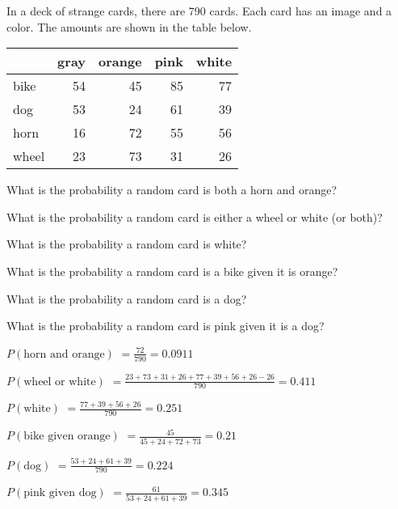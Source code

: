 
\begin{question}
In a deck of strange cards, there are 790 cards. Each card has an image
and a color. The amounts are shown in the table below.

\begin{longtable}[]{@{}lrrrr@{}}
\toprule
& gray & orange & pink & white\tabularnewline
\midrule
\endhead
bike & 54 & 45 & 85 & 77\tabularnewline
dog & 53 & 24 & 61 & 39\tabularnewline
horn & 16 & 72 & 55 & 56\tabularnewline
wheel & 23 & 73 & 31 & 26\tabularnewline
\bottomrule
\end{longtable}
\begin{answerlist}
  \item What is the probability a random card is both a horn and orange?
  \item What is the probability a random card is either a wheel or white (or
both)?
  \item What is the probability a random card is white?
  \item What is the probability a random card is a bike given it is orange?
  \item What is the probability a random card is a dog?
  \item What is the probability a random card is pink given it is a dog?
\end{answerlist}
\end{question}

\begin{solution}
\begin{answerlist}
  \item \(P(\text{horn and orange})\) \(=\frac{72}{790}=0.0911\)
  \item \(P(\text{wheel or white})\)
\(=\frac{23+73+31+26+77+39+56+26-26}{790}=0.411\)
  \item \(P(\text{white})\) \(=\frac{77+39+56+26}{790}=0.251\)
  \item \(P(\text{bike given orange})\) \(=\frac{45}{45+24+72+73}=0.21\)
  \item \(P(\text{dog})\) \(=\frac{53+24+61+39}{790}=0.224\)
  \item \(P(\text{pink given dog})\) \(=\frac{61}{53+24+61+39}=0.345\)
\end{answerlist}
\end{solution}

